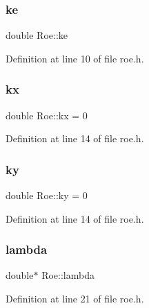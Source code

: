 \mbox{\label{classRoe_aa3b9084d2014f158b13820aab143ee7b}} 
\subsubsection{\texorpdfstring{ke}{ke}}
{\footnotesize\ttfamily double Roe\+::ke\hspace{0.3cm}{\ttfamily [private]}}



Definition at line 10 of file roe.\+h.

\mbox{\label{classRoe_acd00b091fb49655aa37348550daa0723}} 
\subsubsection{\texorpdfstring{kx}{kx}}
{\footnotesize\ttfamily double Roe\+::kx = 0\hspace{0.3cm}{\ttfamily [private]}}



Definition at line 14 of file roe.\+h.

\mbox{\label{classRoe_a4b23fbf92c73f2ca7e1e5c5f95a53d4f}} 
\subsubsection{\texorpdfstring{ky}{ky}}
{\footnotesize\ttfamily double Roe\+::ky = 0\hspace{0.3cm}{\ttfamily [private]}}



Definition at line 14 of file roe.\+h.

\mbox{\label{classRoe_a1c3867060e716158854f70de4cc06c9d}} 
\subsubsection{\texorpdfstring{lambda}{lambda}}
{\footnotesize\ttfamily double$\ast$ Roe\+::lambda\hspace{0.3cm}{\ttfamily [private]}}



Definition at line 21 of file roe.\+h.

